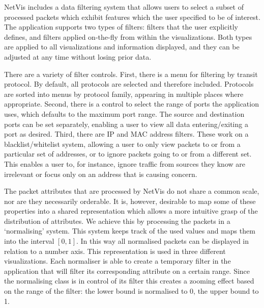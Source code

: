 NetVis includes a data filtering system that allows users to select a subset of processed packets
which exhibit features which the user specified to be of interest. The application supports two
types of filters: filters that the user explicitly defines, and filters applied on-the-fly from
within the visualizations. Both types are applied to all visualizations and information displayed,
and they can be adjusted at any time without losing prior data.

There are a variety of filter controls. First, there is a menu for filtering by transit protocol.
By default, all protocols are selected and therefore included. Protocols are sorted into menus by
protocol family, appearing in multiple places where appropriate. Second, there is a control to
select the range of ports the application uses, which defaults to the maximum port range.  The
source and destination ports can be set separately, enabling a user to view all data
entering/exiting a port as desired.  Third, there are IP and MAC address filters.  These work on a
blacklist/whitelist system, allowing a user to only view packets to or from a particular set of
addresses, or to ignore packets going to or from a different set.  This enables a user to, for
instance, ignore traffic from sources they know are irrelevant or focus only on an address that is
causing concern.

The packet attributes that are processed by NetVis do not share a common scale, nor are they
necessarily orderable. It is, however, desirable to map some of these properties into a shared
representation which allows a more intuitive grasp of the distribution of attributes. We achieve
this by processing the packets in a `normalising' system. This system keeps track of the used values
and maps them into the interval $[0,1]$. In this way all normalised packets can be displayed in
relation to a number axis. This representation is used in three different visualizations. Each
normaliser is able to create a temporary filter in the application that will filter its
corresponding attribute on a certain range. Since the normalising class is in control of its filter
this creates a zooming effect based on the range of the filter: the lower bound is normalised to 0,
the upper bound to 1.


